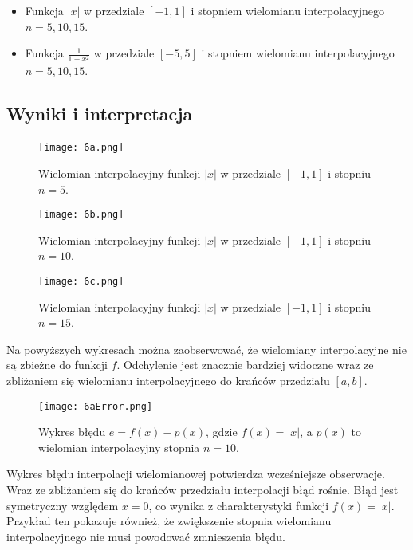 \documentclass[a4paper]{article}
\theoremstyle{plain}
\begin{document}
\begin{center}
\begin{itemize}
\item	Funkcja $|x|$ w przedziale $[-1, 1]$ i stopniem wielomianu interpolacyjnego $n = 5, 10, 15$.
\item	Funkcja $\frac{1}{1 + x^2}$ w przedziale $[-5, 5]$ i stopniem wielomianu interpolacyjnego $n = 5, 10, 15$.
\end{itemize}
\end{center}
\clearpage

\subsection{Wyniki i interpretacja}
\paragraph{}
\begin{figure}[!htb]
  \texttt{[image: 6a.png]}
  \caption{Wielomian interpolacyjny funkcji $|x|$ w przedziale $[-1, 1]$ i stopniu $n = 5$.}
\endminipage\hfill
{}
  \texttt{[image: 6b.png]}
  \caption{Wielomian interpolacyjny funkcji $|x|$ w przedziale $[-1, 1]$ i stopniu $n = 10$.}
\endminipage\hfill
{}%
  \texttt{[image: 6c.png]}
  \caption{Wielomian interpolacyjny funkcji $|x|$ w przedziale $[-1, 1]$ i stopniu $n = 15$.}
\endminipage
\end{figure}

Na powyższych wykresach można zaobserwować, że wielomiany interpolacyjne nie są zbieżne do funkcji $f$. Odchylenie jest znacznie bardziej widoczne wraz ze zbliżaniem się wielomianu interpolacyjnego do krańców przedziału $[a, b]$.

\begin{figure}[htbp]
  \centering
  \texttt{[image: 6aError.png]}
  \caption{Wykres błędu $e = f(x) - p(x)$, gdzie $f(x) = |x|$, a $p(x)$ to wielomian interpolacyjny stopnia $n = 10$.}
\end{figure}

Wykres błędu interpolacji wielomianowej potwierdza wcześniejsze obserwacje. Wraz ze zbliżaniem się do krańców przedziału interpolacji błąd rośnie. Błąd jest symetryczny względem $x = 0$, co wynika z charakterystyki funkcji $f(x) = |x|$. Przykład ten pokazuje również, że zwiększenie stopnia wielomianu interpolacyjnego nie musi powodować zmnieszenia błędu.
\clearpage
\end{document}
